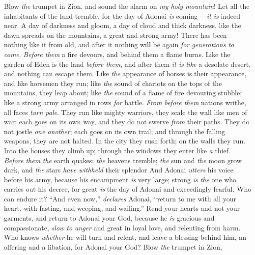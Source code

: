 \begin{biblechapter} %
 Blow \textit{the} trumpet in Zion, 
and sound the alarm on \textit{my holy mountain}! 
Let all the inhabitants of the land tremble, 
for the day of Adonai \textit{is} coming 
—\textit{it is} indeed near.
\verse A day of darkness and gloom, 
a day of cloud and thick darkness, 
like the dawn spreads on the mountains, 
a great and strong army! 
There has been nothing like it from old, 
and after it nothing will be again \textit{for generations to come}.
\verse \textit{Before them} a fire devours, 
and behind them a flame burns. 
Like the garden of Eden is the land \textit{before them}, 
and after them \textit{it is like} a desolate desert, 
and nothing can escape them.
\verse Like \textit{the} appearance of horses is their appearance, 
and like horsemen they run;
\verse like \textit{the} sound of chariots on the tops of the mountains, they leap about; 
like \textit{the} sound of a flame of fire 
devouring stubble; 
like a strong army arranged 
in rows \textit{for} battle.
\verse \textit{From before them} nations writhe, 
all faces \textit{turn pale}.
\verse They run like mighty warriors, 
they scale the wall like men of war; 
each goes on its own way, 
and they do not swerve \textit{from} their paths.
\verse They do not jostle \textit{one another}; 
each goes on its own trail; 
and through the falling weapons, 
they are not halted.
\verse In the city they rush forth; 
on the walls they run. 
Into the houses they climb up; 
through the windows 
they enter like \textit{a} thief.
\verse \textit{Before them} \textit{the} earth quakes; 
\textit{the} heavens tremble; 
\textit{the} sun and \textit{the} moon grow dark, 
and \textit{the} stars \textit{have withheld} their splendor
\verse And Adonai \textit{utters} his voice before his army, 
because his encampment \textit{is} very large; 
strong \textit{is the} one who carries out his decree, 
for great \textit{is} the day of Adonai 
and exceedingly fearful. 
Who can endure it?
 “And even now,” \textit{declares} Adonai, 
“return to me with all your heart, 
with fasting, and weeping, and wailing.”
\verse Rend your hearts and not your garments, 
and return to Adonai your God, 
because he \textit{is} gracious and compassionate, 
\textit{slow to anger} and great in loyal love, 
and relenting from harm.
\verse Who knows \textit{whether} he will turn and relent, 
and leave a blessing behind him, 
an offering and a libation, 
for Adonai your God?
\verse Blow \textit{the} trumpet in Zion, 

\end{biblechapter}
